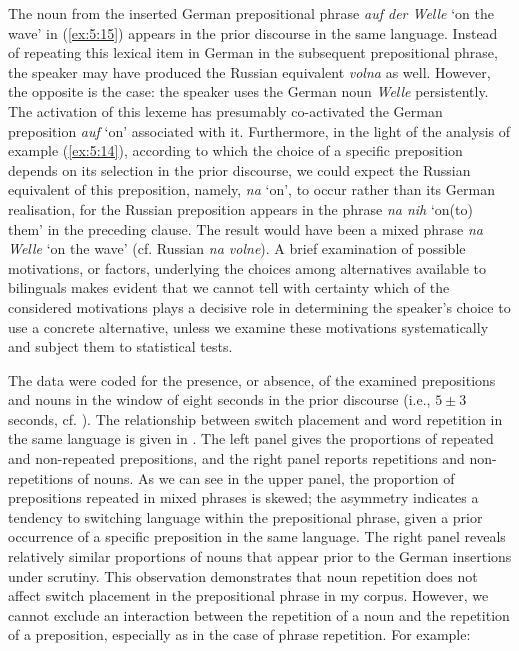 \noindent The noun from the inserted German prepositional phrase \textit{auf der Welle} `on the wave' in (\ref{ex:5:15}) appears in the prior discourse in the same language. Instead of repeating this lexical item in German in the subsequent prepositional phrase, the speaker may have produced the Russian equivalent \textit{volna} as well. However, the opposite is the case: the speaker uses the German noun \textit{Welle} persistently. The activation of this lexeme has presumably co-activated the German preposition \textit{auf} `on' associated with it. Furthermore, in the light of the analysis of example (\ref{ex:5:14}), according to which the choice of a specific preposition depends on its selection in the prior discourse, we could expect the Russian equivalent of this preposition, namely, \textit{na} `on', to occur rather than its German realisation, for the Russian preposition appears in the phrase \textit{na nih} `on(to) them' in the preceding clause. The result would have been a mixed phrase \textit{na Welle} `on the wave' (cf. Russian \textit{na volne}). A brief examination of possible motivations, or factors, underlying the choices among alternatives available to bilinguals makes evident that we cannot tell with certainty which of the considered motivations plays a decisive role in determining the speaker's choice to use a concrete alternative, unless we examine these motivations systematically and subject them to statistical tests.

The data were coded for the presence, or absence, of the examined prepositions and nouns in the window of eight seconds in the prior discourse (i.e., $5 \pm 3$ seconds, cf. \citealt[189]{szmrecsanyi2006}). The relationship between switch placement and word repetition in the same language is given in . The left panel gives the proportions of repeated and non-repeated prepositions, and the right panel reports repetitions and non-repetitions of nouns. As we can see in the upper panel, the proportion of prepositions repeated in mixed phrases is skewed; the asymmetry indicates a tendency to switching language within the prepositional phrase, given a prior occurrence of a specific preposition in the same language. The right panel reveals relatively similar proportions of nouns that appear prior to the German insertions under scrutiny. This observation demonstrates that noun repetition does not affect switch placement in the prepositional phrase in my corpus. However, we cannot exclude an interaction between the repetition of a noun and the repetition of a preposition, especially as in the case of phrase repetition. For example:


